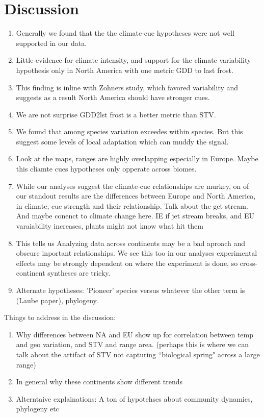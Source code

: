 \documentclass[12pt]{article}\usepackage[]{graphicx}\usepackage[]{color}
\begin{document}
\section*{Discussion}
\begin{enumerate}
\item Generally we found that the the climate-cue hypotheses were not well supported in our data. 
\item Little evidence for climate intensity, and support for  the climate variability hypothesis only in North America with one metric GDD to last frost.
\item This finding is inline with Zohners study, which favored variability and suggests as a result North America should have stronger cues.
\item We are not surprise GDD2lst frost is a better metric than STV. 
\item We found that among species variation exceedes within species. But this suggest some levels of local adaptation which can muddy the signal.
\item Look at the maps, ranges are highly overlapping especially in Europe. Maybe this cliamte cues hypotheses only opperate across biomes.
\item While our analyses suggest the climate-cue relationships are murkey, on of our standout results are the differences between Europe and North America, in climate, cue strength and their relationship. Talk about the get stream. And maybe conenct to climate change here. IE if jet stream breaks, and EU varaiability increases, plants might not know what hit them
\item This tells us  Analyzing data across continents may be a bad aproach and obscure inportant relationships.  We see this too in our analyses experimental effects may be strongly dependent on where the experiment is done, so cross-continent syntheses are tricky. 

\item Alternate hypotheses: 'Pioneer' species versus whatever the other term is (Laube paper), phylogeny.

\end{enumerate}


Things to address in the discussion:
\begin{enumerate}
\item Why differences between NA and EU show up for correlation between temp and geo variation, and STV and range area. (perhaps this is where we can talk about the artifact of STV not capturing ``biological spring" across a large range)
\item In general why these continents show different trends
\item Alterntaive explainations: A ton of hypotehses about community dynamics, phylogeny etc

\end{enumerate}

\end{document}
